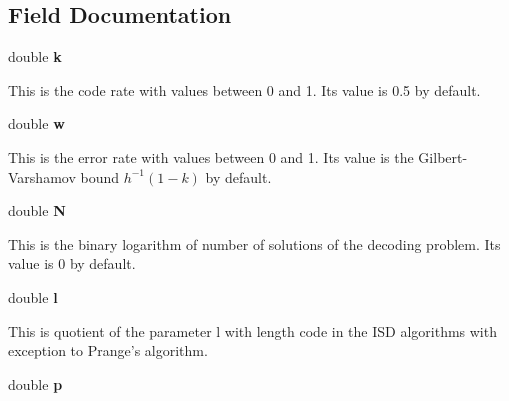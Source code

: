 \subsection{\-Field \-Documentation}

\begin{description}


\hypertarget{structwf__params_ac8a270bda1a0784095b5ec578129c28a}{
\item[ ]{\setlength{\rightskip}{0pt plus 5cm}double {\bf k}}}\label{structwf__params_ac8a270bda1a0784095b5ec578129c28a}

\-This is the code rate with values between 0 and 1. Its value is 0.5 by default.

\hypertarget{structwf__params_afb3248bab1c7ee0ad97e9d4c275b4c67}{
\item[ ]{\setlength{\rightskip}{0pt plus 5cm}double {\bf w}}}\label{structwf__params_afb3248bab1c7ee0ad97e9d4c275b4c67}

\-This is the error rate with values between 0 and 1. Its value is the Gilbert-Varshamov bound $h^{-1}(1-k)$ by default.

\hypertarget{structwf__params_aed54e3f02ef7426fd92cd6e7e1cd181c}{
\item[ ]{\setlength{\rightskip}{0pt plus 5cm}double {\bf \-N}}}\label{structwf__params_aed54e3f02ef7426fd92cd6e7e1cd181c}

\-This is the binary logarithm of number of solutions of the decoding problem. Its value is 0 by default.

\hypertarget{structwf__params_a59e80b8ba32c12c6d0a868f17a19ae48}{
\item[ ]{\setlength{\rightskip}{0pt plus 5cm}double {\bf l}}}\label{structwf__params_a59e80b8ba32c12c6d0a868f17a19ae48}

\-This is quotient of the parameter l with length code in the ISD algorithms with exception to Prange's algorithm. 

\hypertarget{structwf__params_aace2d484b0e3651abd108f04803d316c}{
\item[ ]{\setlength{\rightskip}{0pt plus 5cm}double {\bf p}}}\label{structwf__params_aace2d484b0e3651abd108f04803d316c}


\end{description}

